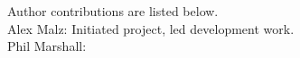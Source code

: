 Author contributions are listed below. \\
Alex Malz: Initiated project, led development work. \\
Phil Marshall:  \\
